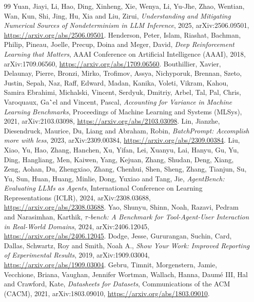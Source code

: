 \documentclass[11pt,a4paper]{article}
\begin{document}
\begin{thebibliography}{99}
 Yuan, Jiayi, Li, Hao, Ding, Xinheng, Xie, Wenya, Li, Yu-Jhe, Zhao, Wentian, Wan, Kun, Shi, Jing, Hu, Xia and Liu, Zirui, \emph{Understanding and Mitigating Numerical Sources of Nondeterminism in {LLM} Inference}, 2025, arXiv:2506.09501, \url{https://arxiv.org/abs/2506.09501}.
 Henderson, Peter, Islam, Riashat, Bachman, Philip, Pineau, Joelle, Precup, Doina and Meger, David, \emph{Deep Reinforcement Learning that Matters}, AAAI Conference on Artificial Intelligence (AAAI), 2018, arXiv:1709.06560, \url{https://arxiv.org/abs/1709.06560}.
 Bouthillier, Xavier, Delaunay, Pierre, Bronzi, Mirko, Trofimov, Assya, Nichyporuk, Brennan, Szeto, Justin, Sepah, Naz, Raff, Edward, Madan, Kanika, Voleti, Vikram, Kahou, Samira Ebrahimi, Michalski, Vincent, Serdyuk, Dmitriy, Arbel, Tal, Pal, Chris, Varoquaux, Ga{\``e}l and Vincent, Pascal, \emph{Accounting for Variance in Machine Learning Benchmarks}, Proceedings of Machine Learning and Systems (MLSys), 2021, arXiv:2103.03098, \url{https://arxiv.org/abs/2103.03098}.
 Lin, Jianzhe, Diesendruck, Maurice, Du, Liang and Abraham, Robin, \emph{{BatchPrompt}: Accomplish more with less}, 2023, arXiv:2309.00384, \url{https://arxiv.org/abs/2309.00384}.
 Liu, Xiao, Yu, Hao, Zhang, Hanchen, Xu, Yifan, Lei, Xuanyu, Lai, Hanyu, Gu, Yu, Ding, Hangliang, Men, Kaiwen, Yang, Kejuan, Zhang, Shudan, Deng, Xiang, Zeng, Aohan, Du, Zhengxiao, Zhang, Chenhui, Shen, Sheng, Zhang, Tianjun, Su, Yu, Sun, Huan, Huang, Minlie, Dong, Yuxiao and Tang, Jie, \emph{{AgentBench}: Evaluating {LLM}s as Agents}, International Conference on Learning Representations (ICLR), 2024, arXiv:2308.03688, \url{https://arxiv.org/abs/2308.03688}.
 Yao, Shunyu, Shinn, Noah, Razavi, Pedram and Narasimhan, Karthik, \emph{{$\tau$}-bench: A Benchmark for Tool-Agent-User Interaction in Real-World Domains}, 2024, arXiv:2406.12045, \url{https://arxiv.org/abs/2406.12045}.
 Dodge, Jesse, Gururangan, Suchin, Card, Dallas, Schwartz, Roy and Smith, Noah A., \emph{Show Your Work: Improved Reporting of Experimental Results}, 2019, arXiv:1909.03004, \url{https://arxiv.org/abs/1909.03004}.
 Gebru, Timnit, Morgenstern, Jamie, Vecchione, Briana, Vaughan, Jennifer Wortman, Wallach, Hanna, Daum{\'e} III, Hal and Crawford, Kate, \emph{Datasheets for Datasets}, Communications of the ACM (CACM), 2021, arXiv:1803.09010, \url{https://arxiv.org/abs/1803.09010}.
\end{thebibliography}
\end{document}

